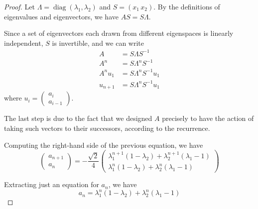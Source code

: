 \documentclass{article}
\DeclareMathOperator{\diag}{diag}
\begin{document}
\begin{proof}
    Let $\Lambda = \diag{(\lambda_1, \lambda_2)}$ and $S = (x_1\, x_2)$. By the
    definitions of eigenvalues and eigenvectors, we have $AS = S\Lambda$.

    Since a set of eigenvectors each drawn from different eigenspaces is
    linearly independent, $S$ is invertible, and we can write
    \begin{align*}
        A &= S \Lambda S^{-1} \\
        A^n &= S \Lambda^n S^{-1} \\
        A^n u_1 &= S \Lambda^n S^{-1} u_1 \\
        u_{n+1} &= S \Lambda^n S^{-1} u_1
    \end{align*}
    where $u_i = \left(\begin{array}{c} a_i \\ a_{i-1} \end{array}\right)$.

    The last step is due to the fact that we designed $A$ precisely to have the
    action of taking such vectors to their successors, according to the
    recurrence.

    Computing the right-hand side of the previous equation, we have
    \begin{equation*}
        \left(
            \begin{array}{c}
                a_{n+1} \\
                a_n
            \end{array}
        \right)
        =
        - \frac{\sqrt{2}}{4}
        \left(
            \begin{array}{c}
                \lambda_1^{n+1} (1 - \lambda_2)
                + \lambda_2^{n+1} (\lambda_1 - 1) \\
                \lambda_1^{n} (1 - \lambda_2)
                + \lambda_2^{n} (\lambda_1 - 1)
            \end{array}
        \right)
    \end{equation*}

    Extracting just an equation for $a_n$, we have
    \begin{equation*}
        a_n = \lambda_1^{n} (1 - \lambda_2) + \lambda_2^{n} (\lambda_1 - 1)
    \end{equation*}
\end{proof}
\end{document}
